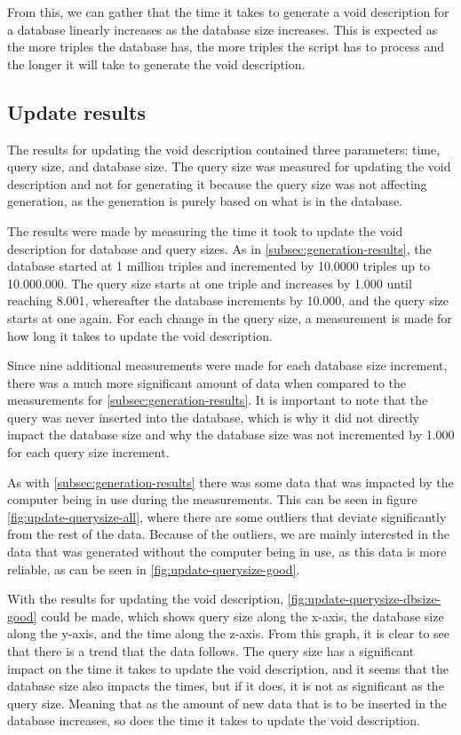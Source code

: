 From this, we can gather that the time it takes to generate a \gls{void} description for a database linearly increases as the database size increases. This is expected as the more triples the database has, the more triples the script has to process and the longer it will take to generate the \gls{void} description.


\subsection{Update results}\label{subsec:update-results}
The results for updating the \gls{void} description contained three parameters: time, query size, and database size. The query size was measured for updating the \gls{void} description and not for generating it because the query size was not affecting generation, as the generation is purely based on what is in the database.

The results were made by measuring the time it took to update the \gls{void} description for database and query sizes. As in \autoref{subsec:generation-results}, the database started at 1 million triples and incremented by 10.0000 triples up to 10.000.000. The query size starts at one triple and increases by 1.000 until reaching 8.001, whereafter the database increments by 10.000, and the query size starts at one again. For each change in the query size, a measurement is made for how long it takes to update the \gls{void} description.

Since nine additional measurements were made for each database size increment, there was a much more significant amount of data when compared to the measurements for \autoref{subsec:generation-results}. It is important to note that the query was never inserted into the database, which is why it did not directly impact the database size and why the database size was not incremented by 1.000 for each query size increment.

As with \autoref{subsec:generation-results} there was some data that was impacted by the computer being in use during the measurements. This can be seen in figure \autoref{fig:update-querysize-all}, where there are some outliers that deviate significantly from the rest of the data. Because of the outliers, we are mainly interested in the data that was generated without the computer being in use, as this data is more reliable, as can be seen in \autoref{fig:update-querysize-good}.

With the results for updating the \gls{void} description, \autoref{fig:update-querysize-dbsize-good} could be made, which shows query size along the x-axis, the database size along the y-axis, and the time along the z-axis. From this graph, it is clear to see that there is a trend that the data follows. The query size has a significant impact on the time it takes to update the \gls{void} description, and it seems that the database size also impacts the times, but if it does, it is not as significant as the query size. Meaning that as the amount of new data that is to be inserted in the database increases, so does the time it takes to update the \gls{void} description.


